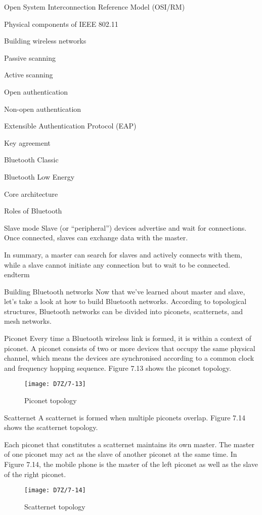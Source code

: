 \documentclass[a4paper,12pt]{book}
\begin{document}
\begin{term}{Open System Interconnection Reference Model (OSI/RM)}
\begin{term}{Physical components of IEEE 802.11}
\begin{term}{Building wireless networks}
\begin{term}{Passive scanning}
\begin{term}{Active scanning}
\begin{term}{Open authentication}
\begin{term}{Non-open authentication}
\begin{term}{Extensible Authentication Protocol (EAP)}
\begin{term}{Key agreement}
\begin{term}{Bluetooth Classic}
\begin{term}{Bluetooth Low Energy}
\begin{term}{Core architecture}
\begin{term}{Roles of Bluetooth}
    \begin{secterm}{Slave mode}
        Slave (or “peripheral”) devices advertise and wait for connections. Once connected, slaves can exchange data with the master.
    \end{secterm}

    In summary, a master can search for slaves and actively connects with them, while a slave cannot initiate any connection but to wait to be connected.
\\end{term}{}

\begin{term}{Building Bluetooth networks}
    Now that we’ve learned about master and slave, let’s take a look at how to build Bluetooth networks. According to topological structures, Bluetooth networks can be divided into piconets, scatternets, and mesh networks.

    \parskip 6pt
    \begin{secterm}{Piconet}
        Every time a Bluetooth wireless link is formed, it is within a context of piconet. A piconet consists of two or more devices that occupy the same physical channel, which means the devices are synchronised according to a common clock and frequency hopping sequence. Figure 7.13 shows the piconet topology.

        \begin{figure}[!h]
            \centering
            \texttt{[image: D7Z/7-13]}
            \caption{Piconet topology}
        \end{figure}
    \end{secterm}

    \begin{secterm}{Scatternet}
        A scatternet is formed when multiple piconets overlap. Figure 7.14 shows the scatternet topology.

        \vspace{6pt}
        Each piconet that constitutes a scatternet maintains its own master. The master of one piconet may act as the slave of another piconet at the same time. In Figure 7.14, the mobile phone is the master of the left piconet as well as the slave of the right piconet.

        \begin{figure}[!h]
            \centering
            \texttt{[image: D7Z/7-14]}
            \caption{Scatternet topology}
        \end{figure}
    \end{secterm}


\end{term}
\end{term}
\end{term}
\end{term}
\end{term}
\end{term}
\end{term}
\end{term}
\end{term}
\end{term}
\end{term}
\end{term}
\end{term}
\end{term}
\end{document}
